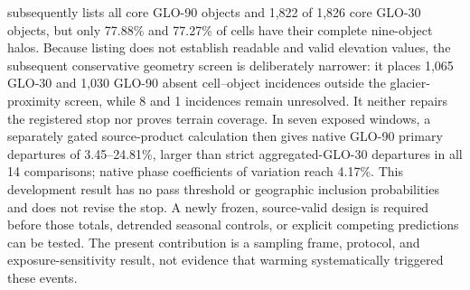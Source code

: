 \documentclass[11pt]{article}
\begin{document}
subsequently lists all core GLO-90 objects and 1,822 of 1,826 core GLO-30
objects, but only 77.88\% and 77.27\% of cells have their complete nine-object
halos. Because listing does not establish readable and valid elevation values,
the subsequent conservative geometry screen is deliberately narrower: it
places 1,065 GLO-30 and 1,030 GLO-90 absent cell--object incidences outside the
glacier-proximity screen, while 8 and 1 incidences remain unresolved. It
neither repairs the registered stop nor proves terrain coverage. In seven
exposed windows, a separately gated source-product calculation then gives
native GLO-90 primary departures of 3.45--24.81\%, larger than strict
aggregated-GLO-30 departures in all 14 comparisons; native phase coefficients
of variation reach 4.17\%. This development result has no pass threshold or
geographic inclusion probabilities and does not revise the stop. A newly
frozen, source-valid design is required before those totals, detrended seasonal
controls, or explicit competing predictions can be tested. The present
contribution is a sampling frame, protocol, and exposure-sensitivity result,
not evidence that warming systematically triggered these events.



\end{document}
